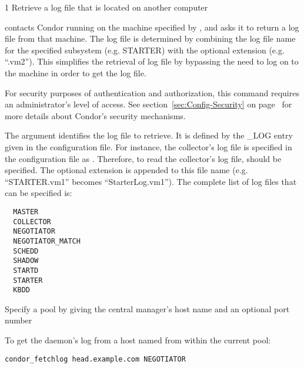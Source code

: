 \begin{ManPage}{\label{man-condor-fetchlog}}{1}
{Retrieve a log file that is located on another computer}

\Synopsis 
{}
\ToolArgsBase

\ToolArgsAffect
{}


\Description 

 contacts Condor running on the machine specified by
, and asks it to return a log file from that
machine.  The log file is determined by combining the log file name
for the specified subsystem (e.g. STARTER) with the optional extension
(e.g. ``.vm2'').  This simplifies the retrieval of log file by
bypassing the need to log on to the machine in order to get the log
file.

For security purposes of authentication and authorization, 
this command requires an administrator's level of access.
See section~\ref{sec:Config-Security} 
on page~\pageref{sec:Config-Security} for more details about Condor's
security mechanisms.

The  argument identifies the log file to retrieve.
It is defined by the \_LOG entry
given in the configuration file.  
For instance, the collector's log file is specified in the
configuration file as .
Therefore, to read the collector's log file, 
should be specified.  
The optional extension is appended to this file name
(e.g. ``STARTER.vm1'' becomes ``StarterLog.vm1''). The complete list of log files that can be specified is:

\begin{verbatim}
  MASTER
  COLLECTOR
  NEGOTIATOR
  NEGOTIATOR_MATCH
  SCHEDD
  SHADOW
  STARTD
  STARTER
  KBDD
\end{verbatim}

\begin{Options}
    \ToolArgsBaseDesc
    {Specify a pool by giving the central manager's host name
    and an optional port number}
    \ToolArgsAffectDesc
\end{Options}

\Examples
To get the  daemon's log from a host named 
 from within the current pool:
\begin{verbatim}
condor_fetchlog head.example.com NEGOTIATOR
\end{verbatim}


\end{ManPage}
